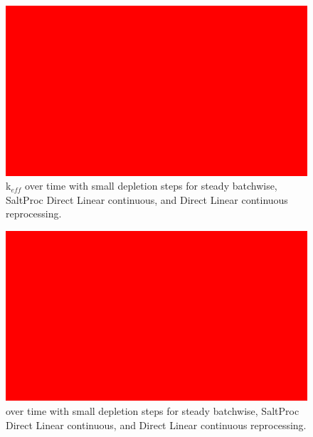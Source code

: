 \begin{figure}[H]
  \centering
  \includegraphics[scale=0.1]{images/placeholder.png}
  \caption{k$_{eff}$ over time with small depletion steps for steady batchwise, SaltProc Direct Linear continuous, and Direct Linear continuous reprocessing.}
   \label{fig:optimal-compare-sspdldl-3}
\end{figure}

\begin{figure}[H]
  \centering
  \includegraphics[scale=0.1]{images/placeholder.png}
  \caption{ over time with small depletion steps for steady batchwise, SaltProc Direct Linear continuous, and Direct Linear continuous reprocessing.}
   \label{fig:SPCR-cont-235u-3}
\end{figure}

